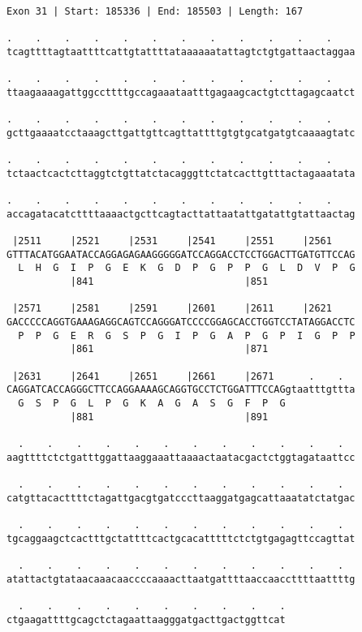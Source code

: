 \documentclass{article}
\begin{document}
\begin{Verbatim}[fontfamily=courier]
Exon 31 | Start: 185336 | End: 185503 | Length: 167

.    .    .    .    .    .    .    .    .    .    .    .    
tcagttttagtaattttcattgtattttataaaaaatattagtctgtgattaactaggaa

.    .    .    .    .    .    .    .    .    .    .    .    
ttaagaaaagattggccttttgccagaaataatttgagaagcactgtcttagagcaatct

.    .    .    .    .    .    .    .    .    .    .    .    
gcttgaaaatcctaaagcttgattgttcagttattttgtgtgcatgatgtcaaaagtatc

.    .    .    .    .    .    .    .    .    .    .    .    
tctaactcactcttaggtctgttatctacagggttctatcacttgtttactagaaatata

.    .    .    .    .    .    .    .    .    .    .    .    
accagatacatcttttaaaactgcttcagtacttattaatattgatattgtattaactag

 |2511     |2521     |2531     |2541     |2551     |2561    
GTTTACATGGAATACCAGGAGAGAAGGGGGATCCAGGACCTCCTGGACTTGATGTTCCAG
  L  H  G  I  P  G  E  K  G  D  P  G  P  P  G  L  D  V  P  G
           |841                          |851               

 |2571     |2581     |2591     |2601     |2611     |2621    
GACCCCCAGGTGAAAGAGGCAGTCCAGGGATCCCCGGAGCACCTGGTCCTATAGGACCTC
  P  P  G  E  R  G  S  P  G  I  P  G  A  P  G  P  I  G  P  P
           |861                          |871               

 |2631     |2641     |2651     |2661     |2671      .    .  
CAGGATCACCAGGGCTTCCAGGAAAAGCAGGTGCCTCTGGATTTCCAGgtaatttgttta
  G  S  P  G  L  P  G  K  A  G  A  S  G  F  P  G            
           |881                          |891               

  .    .    .    .    .    .    .    .    .    .    .    .  
aagttttctctgatttggattaaggaaattaaaactaatacgactctggtagataattcc

  .    .    .    .    .    .    .    .    .    .    .    .  
catgttacacttttctagattgacgtgatcccttaaggatgagcattaaatatctatgac

  .    .    .    .    .    .    .    .    .    .    .    .  
tgcaggaagctcactttgctattttcactgcacatttttctctgtgagagttccagttat

  .    .    .    .    .    .    .    .    .    .    .    .  
atattactgtataacaaacaaccccaaaacttaatgattttaaccaaccttttaattttg

  .    .    .    .    .    .    .    .    .    .
ctgaagattttgcagctctagaattaagggatgacttgactggttcat
\end{Verbatim}
\end{document}
